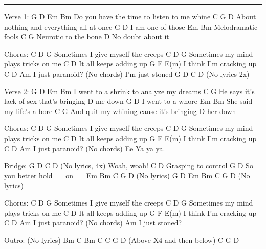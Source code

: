 \noindent\rule{\columnwidth}{1pt}

\begin{comment}
G   (320033) or (355433)
D   (xx0323)
Em  (022000)
Bm  (x24432)
C   (x32010)
F   (133211)
E   (022100)
\end{comment}

\begin{multicols}{2}
\begin{lstsong}
Verse 1:
G               D        Em          Bm
Do you have the time to listen to me whine
C                  G                D
About nothing and everything all at once
G             D
I am one of those
   Em          Bm
Melodramatic fools
   C             G
Neurotic to the bone
                  D
No doubt about it

Chorus:
C           D                 G
  Sometimes I give myself the creeps
C           D                    G
  Sometimes my mind plays tricks on me
    C               D
It all keeps adding up
    G         F      E(m)
I think I'm cracking up
   C           D
Am I just paranoid? 
  (No chords)
I'm just stoned
 G    D     C     D (No lyrics 2x)

Verse 2:
G           D         Em         Bm
I went to a shrink to analyze my dreams
    C                 G
He says it's lack of sex that's bringing
  D
me  down
G           D
I went to a whore
     Em               Bm
She said my life's a bore
     C                G 
And quit my whining cause it's bringing
   D
her  down

Chorus:
C           D                 G
  Sometimes I give myself the creeps
C           D                    G
  Sometimes my mind plays tricks on me
    C               D
It all keeps adding up
    G         F      E(m)
I think I'm cracking up
   C           D
Am I just paranoid? 
  (No chords)
Ee Ya ya ya.

Bridge:
 G    D     C     D  (No lyrics, 4x)
                       Woah, woah!
   C             D
Grasping to control
                  G      D
So you better hold__ on__
Em   Bm   C   G   D          (No lyrics)
G   D   Em   Bm   C   G   D  (No lyrics)

Chorus:
C           D                 G
  Sometimes I give myself the creeps
C           D                    G
  Sometimes my mind plays tricks on me
    C               D
It all keeps adding up
    G         F      E(m)
I think I'm cracking up
   C           D
Am I just paranoid? 
  (No chords)
Am I just stoned?

Outro: (No lyrics)
Bm  C   Bm  C
C   G   D
(Above X4 and then below)
C   G   D
\end{lstsong}
\end{multicols}
\newpage

